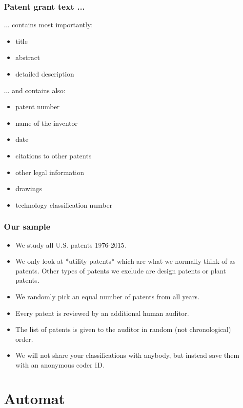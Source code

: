 \documentclass[10pt]{beamer}
\begin{document}
\begin{frame}\frametitle{Patent grant text ...}
... contains most importantly:
	\begin{itemize}	
		\item title
		\item abstract
		\item detailed description
	\end{itemize}
... and contains also:
	\begin{itemize}	
		\item patent number
		\item name of the inventor
		\item date
		\item citations to other patents
		\item other legal information
		\item drawings
		\item technology classification number
	\end{itemize}
\end{frame}


\begin{frame}\frametitle{Our sample}
	\begin{itemize}	
	\item We study all U.S. patents 1976-2015. 
	\item We only look at *utility patents* which are what we normally think of as patents. Other types of patents we exclude are design patents or plant patents.
	\item We randomly pick an equal number of patents from all years.
	\item Every patent is reviewed by an additional human auditor.
	\item The list of patents is given to the auditor in random (not chronological) order.
	\item We will not share your classifications with anybody, but instead save them with an anonymous coder ID.
\end{itemize}
\end{frame}


\section{Automat}
\setcounter{subsection}{1} %
\end{document}
